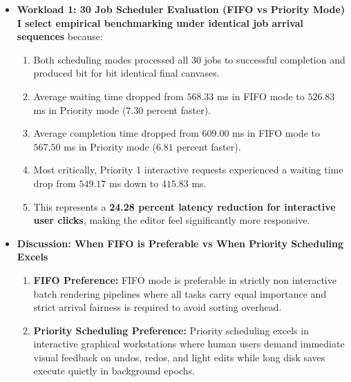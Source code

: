 \documentclass[10pt,a4paper]{article}
\begin{document}
\begin{itemize}[leftmargin=1.2em,noitemsep,topsep=2pt,parsep=1pt]
    \item \textbf{Workload 1: 30 Job Scheduler Evaluation (FIFO vs Priority Mode)}\\[3pt]
    \textbf{I select empirical benchmarking under identical job arrival sequences} because:
    \begin{enumerate}[label=\arabic*),leftmargin=1.5em,noitemsep,topsep=1pt,parsep=1pt]
        \item Both scheduling modes processed all 30 jobs to successful completion and produced bit for bit identical final canvases.
        \item Average waiting time dropped from $568.33$ ms in FIFO mode to $526.83$ ms in Priority mode ($7.30$ percent faster).
        \item Average completion time dropped from $609.00$ ms in FIFO mode to $567.50$ ms in Priority mode ($6.81$ percent faster).
        \item Most critically, Priority 1 interactive requests experienced a waiting time drop from $549.17$ ms down to $415.83$ ms.
        \item This represents a \textbf{24.28 percent latency reduction for interactive user clicks}, making the editor feel significantly more responsive.
    \end{enumerate}

    \item \textbf{Discussion: When FIFO is Preferable vs When Priority Scheduling Excels}
    \begin{enumerate}[label=\arabic*),leftmargin=1.5em,noitemsep,topsep=1pt,parsep=1pt]
        \item \textbf{FIFO Preference:} FIFO mode is preferable in strictly non interactive batch rendering pipelines where all tasks carry equal importance and strict arrival fairness is required to avoid sorting overhead.
        \item \textbf{Priority Scheduling Preference:} Priority scheduling excels in interactive graphical workstations where human users demand immediate visual feedback on undos, redos, and light edits while long disk saves execute quietly in background epochs.
    \end{enumerate}
\end{itemize}
\end{document}
